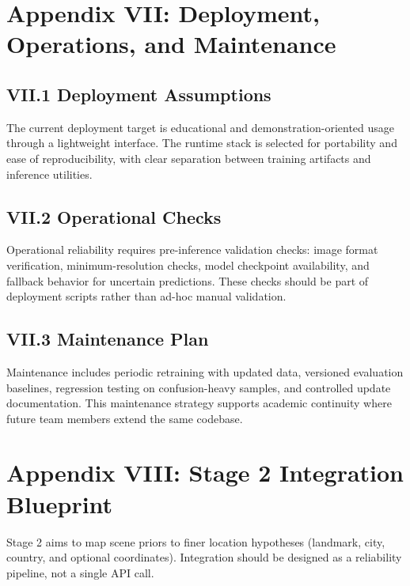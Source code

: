 \section*{Appendix VII: Deployment, Operations, and Maintenance}

\subsection*{VII.1 Deployment Assumptions}
The current deployment target is educational and demonstration-oriented usage through a lightweight interface. The runtime stack is selected for portability and ease of reproducibility, with clear separation between training artifacts and inference utilities.

\subsection*{VII.2 Operational Checks}
Operational reliability requires pre-inference validation checks: image format verification, minimum-resolution checks, model checkpoint availability, and fallback behavior for uncertain predictions. These checks should be part of deployment scripts rather than ad-hoc manual validation.

\subsection*{VII.3 Maintenance Plan}
Maintenance includes periodic retraining with updated data, versioned evaluation baselines, regression testing on confusion-heavy samples, and controlled update documentation. This maintenance strategy supports academic continuity where future team members extend the same codebase.

\section*{Appendix VIII: Stage 2 Integration Blueprint}

Stage 2 aims to map scene priors to finer location hypotheses (landmark, city, country, and optional coordinates). Integration should be designed as a reliability pipeline, not a single API call.

